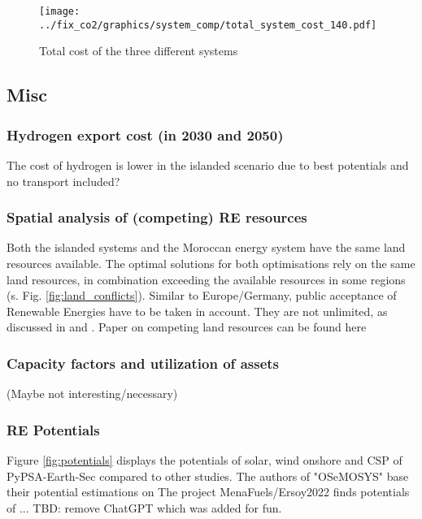 \begin{figure}[h!]
    \centering
    \texttt{[image: ../fix\_co2/graphics/system\_comp/total\_system\_cost\_140.pdf]}
    \caption{Total cost of the three different systems}
    \label{fig:int_sep_total_system_cost}
\end{figure}

\subsection{Misc}

\subsubsection{Hydrogen export cost (in 2030 and 2050)}
The cost of hydrogen is lower in the islanded scenario due to best potentials and no transport included?

\subsubsection{Spatial analysis of (competing) RE resources}
Both the islanded systems and the Moroccan energy system have the same land resources available. 
The optimal solutions for both optimisations rely on the same land resources, in combination exceeding the 
available resources in some regions (s. Fig. \ref{fig:land_conflicts}). 
Similar to Europe/Germany, public acceptance of Renewable Energies have to be taken in account. 
They are not unlimited, as discussed in \cite{Hanger2016} and \cite{TerraponPfaff2019}.
Paper on competing land resources can be found here \cite{Patankar2022}


\subsubsection{Capacity factors and utilization of assets}
(Maybe not interesting/necessary)


\subsubsection{RE Potentials}
Figure \ref{fig:potentials} displays the potentials of solar, wind onshore and CSP 
of PyPSA-Earth-Sec compared to other studies. The authors of "OSeMOSYS" 
\cite{Cannone2021} base their potential estimations on \cite[primary: 13,18,19]{Cannone2021}
The project MenaFuels/Ersoy2022 \cite{Ersoy2022} finds potentials of ...
TBD: remove ChatGPT which was added for fun.

